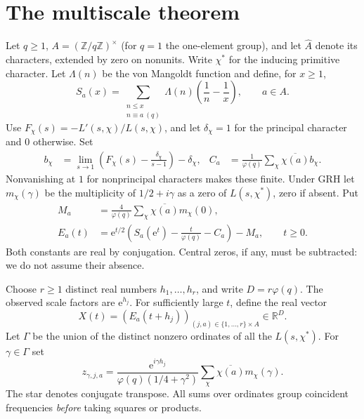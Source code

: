 \documentclass[11pt]{article}
\theoremstyle{remark}\newtheorem{remark}[theorem]{Remark}
\newcommand{\R}{\mathbb R}
\newcommand{\Z}{\mathbb Z}
\newcommand{\e}{\mathrm e}
\newcommand{\ph}{\varphi(q)}
\begin{document}
\section{The multiscale theorem}
Let $q\ge1$, $A=(\Z/q\Z)^\times$ (for $q=1$ the one-element group), and let $\widehat A$ denote its characters, extended by zero on nonunits. Write $\chi^*$ for the inducing primitive character. Let $\Lambda(n)$ be the von Mangoldt function and define, for $x\ge1$,
\begin{equation}\label{eq:sum}
 S_a(x)=\sum_{\substack{n\le x\\n\equiv a\ (q)}}\Lambda(n)\left(\frac1n-\frac1x\right),\qquad a\in A.
\end{equation}
Use $F_\chi(s)=-L'(s,\chi)/L(s,\chi)$, and let $\delta_\chi=1$ for the principal character and $0$ otherwise. Set
\begin{align}
 b_\chi&=\lim_{s\to1}\left(F_\chi(s)-\frac{\delta_\chi}{s-1}\right)-\delta_\chi,&
 C_a&=\frac1{\ph}\sum_\chi\overline{\chi(a)}b_\chi.\label{eq:constants}
\end{align}
Nonvanishing at $1$ for nonprincipal characters makes these finite. Under GRH let $m_\chi(\gamma)$ be the multiplicity of $1/2+i\gamma$ as a zero of $L(s,\chi^*)$, zero if absent. Put
\begin{align}
 M_a&=\frac4{\ph}\sum_\chi\overline{\chi(a)}m_\chi(0),\\
 E_a(t)&=\e^{t/2}\left(S_a(\e^t)-\frac{t}{\ph}-C_a\right)-M_a,\qquad t\ge0.\label{eq:normalized}
\end{align}
Both constants are real by conjugation. Central zeros, if any, must be subtracted: we do not assume their absence.

Choose $r\ge1$ distinct real numbers $h_1,\ldots,h_r$, and write $D=r\ph$. The observed scale factors are $\e^{h_j}$. For sufficiently large $t$, define the real vector
\[
 X(t)=(E_a(t+h_j))_{(j,a)\in\{1,\ldots,r\}\times A}\in\R^D.
\]
Let $\Gamma$ be the union of the distinct nonzero ordinates of all the $L(s,\chi^*)$. For $\gamma\in\Gamma$ set
\begin{equation}\label{eq:coeff}
 z_{\gamma,j,a}=\frac{\e^{i\gamma h_j}}{\ph(1/4+\gamma^2)}\sum_\chi\overline{\chi(a)}m_\chi(\gamma).
\end{equation}
The star denotes conjugate transpose. All sums over ordinates group coincident frequencies \emph{before} taking squares or products.
\end{document}
